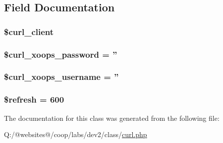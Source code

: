 \subsection{Field Documentation}
\hypertarget{class_c_u_r_l_xortify_exchange_a402f2112991f3227835af80e9df33e38}{
\subsubsection[{\$curl\-\_\-client}]{\setlength{\rightskip}{0pt plus 5cm}\$curl\-\_\-client}}\label{class_c_u_r_l_xortify_exchange_a402f2112991f3227835af80e9df33e38}
\hypertarget{class_c_u_r_l_xortify_exchange_a6c9851541ed3826c67cfe7224c38f0b8}{
\subsubsection[{\$curl\-\_\-xoops\-\_\-password}]{\setlength{\rightskip}{0pt plus 5cm}\$curl\-\_\-xoops\-\_\-password = ''}}\label{class_c_u_r_l_xortify_exchange_a6c9851541ed3826c67cfe7224c38f0b8}
\hypertarget{class_c_u_r_l_xortify_exchange_aab7480ba9f878a02b2c9fd43922fa070}{
\subsubsection[{\$curl\-\_\-xoops\-\_\-username}]{\setlength{\rightskip}{0pt plus 5cm}\$curl\-\_\-xoops\-\_\-username = ''}}\label{class_c_u_r_l_xortify_exchange_aab7480ba9f878a02b2c9fd43922fa070}
\hypertarget{class_c_u_r_l_xortify_exchange_a8527f826b6959aaa92b0e51ee427ba1a}{
\subsubsection[{\$refresh}]{\setlength{\rightskip}{0pt plus 5cm}\$refresh = 600}}\label{class_c_u_r_l_xortify_exchange_a8527f826b6959aaa92b0e51ee427ba1a}


The documentation for this class was generated from the following file\-:\begin{DoxyCompactItemize}
\item 
Q\-:/@websites@/coop/labs/dev2/class/\hyperlink{curl_8php}{curl.\-php}\end{DoxyCompactItemize}
